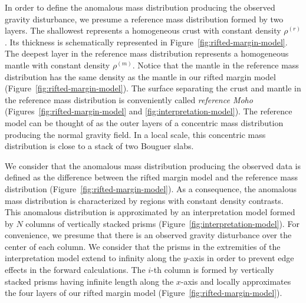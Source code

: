 \documentclass[manuscript]{geophysics}
\begin{document}
In order to define the anomalous mass distribution producing the observed gravity
disturbance, we presume a reference mass distribution formed by two 
layers. The shallowest represents a homogeneous crust with constant
density $\rho^{(r)}$. Its thickness is schematically represented in
Figure~\ref{fig:rifted-margin-model}.
The deepest layer in the reference mass distribution represents a homogeneous mantle
with constant density $\rho^{(m)}$. Notice that the mantle in the reference mass 
distribution has the same density as the mantle in our rifted margin model
(Figure~\ref{fig:rifted-margin-model}).
The surface separating the crust and mantle in the reference mass distribution 
is conveniently called \textit{reference Moho} (Figures~\ref{fig:rifted-margin-model} 
and \ref{fig:interpretation-model}).
The reference model can be thought of as the outer layers of a concentric
mass distribution producing the normal gravity field.
In a local scale, this concentric mass distribution is close to a 
stack of two Bouguer slabs.

We consider that the anomalous mass distribution producing the observed data
is defined as the difference between the rifted margin model 
and the reference mass distribution (Figure~\ref{fig:rifted-margin-model}).
As a consequence, the anomalous mass distribution is characterized by regions
with constant density contrasts.
This anomalous distribution is approximated by an interpretation model 
formed by $N$ columns of vertically stacked prisms 
(Figure~\ref{fig:interpretation-model}).
For convenience, we presume that there is an observed gravity disturbance over the
center of each column.
We consider that the prisms in the extremities of the interpretation model extend to
infinity along the $y$-axis in order to prevent edge effects in the forward 
calculations. 
The $i$-th column is formed by vertically stacked prisms having infinite length along 
the $x$-axis and locally approximates the four layers of our rifted margin model
(Figure~\ref{fig:rifted-margin-model}).
\end{document}
